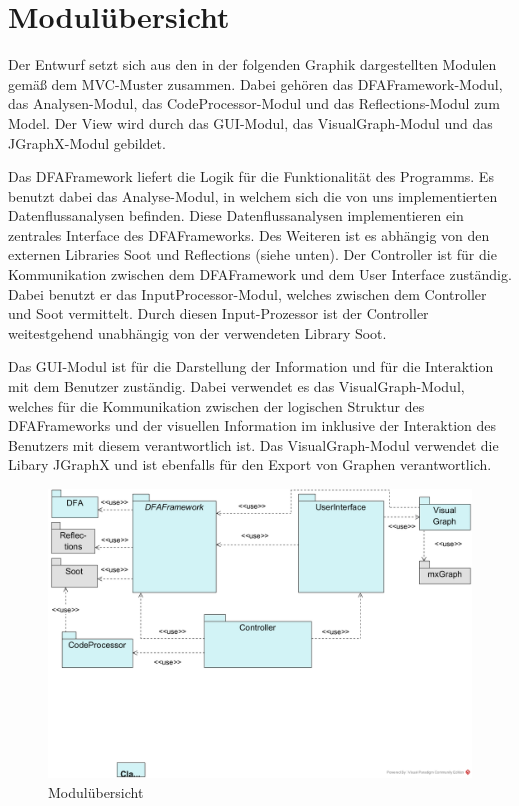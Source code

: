 \section{Modulübersicht}
Der Entwurf setzt sich aus den in der folgenden Graphik dargestellten Modulen gemäß dem MVC-Muster zusammen.
Dabei gehören das DFAFramework-Modul, das Analysen-Modul, das CodeProcessor-Modul und das Reflections-Modul zum Model. 
Der View wird durch das GUI-Modul, das VisualGraph-Modul und das JGraphX-Modul gebildet. \par
Das DFAFramework liefert die Logik für die Funktionalität des Programms. 
Es benutzt dabei das Analyse-Modul, in welchem sich die von uns implementierten Datenflussanalysen befinden. 
Diese Datenflussanalysen implementieren ein zentrales Interface des DFAFrameworks. 
Des Weiteren ist es abhängig von den externen Libraries Soot und Reflections (siehe unten). 
Der Controller ist für die Kommunikation zwischen dem DFAFramework und dem User Interface zuständig. 
Dabei benutzt er das InputProcessor-Modul, welches zwischen dem Controller und Soot vermittelt. 
Durch diesen Input-Prozessor ist der Controller weitestgehend unabhängig von der verwendeten Library Soot. \par 
Das GUI-Modul ist für die Darstellung der Information und für die Interaktion mit dem Benutzer zuständig. 
Dabei verwendet es das VisualGraph-Modul, welches für die Kommunikation zwischen der logischen Struktur des DFAFrameworks und der visuellen Information im  inklusive der Interaktion des Benutzers mit diesem verantwortlich ist. 
Das VisualGraph-Modul verwendet die Libary JGraphX und ist ebenfalls für den Export von Graphen verantwortlich.

\begin{figure}[htbp] 
  \centering
     \includegraphics[width=1\textwidth]{Entwurfsentscheidungen/PackageOverview}
  \caption{Modulübersicht}
  \label{fig:Ubersicht}
\end{figure}

